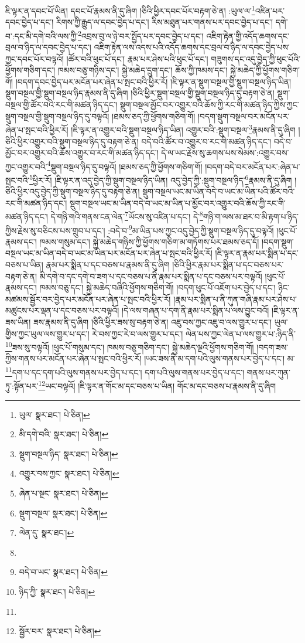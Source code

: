 ཇི་ལྟར་ན་དབང་པོ་ཡིན། དབང་པོ་རྣམས་ནི་དུ་ཞིག །ཅིའི་ཕྱིར་དབང་པོར་བརྟག་ཅེ་ན། :ཡུལ་ལ་\footnote{ཡུལ་  སྣར་ཐང་།  པེ་ཅིན། }འཛིན་པར་དབང་བྱེད་པ་དང་། རིགས་ཀྱི་རྒྱུད་ལ་དབང་བྱེད་པ་དང་། རིས་མཐུན་པར་གནས་པར་དབང་བྱེད་པ་དང་། དགེ་བ་:དང་མི་དགེ་བའི་ལས་ཀྱི་\footnote{མི་དགེ་བའི་  སྣར་ཐང་།  པེ་ཅིན། }འབྲས་བུ་ལ་ཉེ་བར་སྤྱོད་པར་དབང་བྱེད་པ་དང་། འཇིག་རྟེན་གྱི་འདོད་ཆགས་དང་བྲལ་བ་ཉིད་ལ་དབང་བྱེད་པ་དང་། འཇིག་རྟེན་ལས་འདས་པའི་འདོད་ཆགས་དང་བྲལ་བ་ཉིད་ལ་དབང་བྱེད་པས་ཀྱང་དབང་པོར་བལྟའོ། །ཚོར་བའི་ཕུང་པོ་དང་། རྣམ་པར་ཤེས་པའི་ཕུང་པོ་དང་། གཟུགས་དང་འདུ་བྱེད་ཀྱི་ཕུང་པོའི་ཕྱོགས་གཅིག་དང་། ཁམས་བཅུ་གཉིས་དང་། སྐྱེ་མཆེད་དྲུག་དང་། ཆོས་ཀྱི་ཁམས་དང་། སྐྱེ་མཆེད་ཀྱི་ཕྱོགས་གཅིག་གོ། །བདག་དབང་བྱེད་པར་མངོན་པར་ཞེན་པ་སྤང་བའི་ཕྱིར་རོ། །ཇི་ལྟར་ན་སྡུག་བསྔལ་གྱི་སྡུག་བསྔལ་ཉིད་ཡིན། སྡུག་བསྔལ་གྱི་སྡུག་བསྔལ་ཉིད་རྣམས་ནི་དུ་ཞིག །ཅིའི་ཕྱིར་སྡུག་བསྔལ་གྱི་སྡུག་བསྔལ་ཉིད་དུ་བརྟག་ཅེ་ན། སྡུག་བསྔལ་གྱི་ཚོར་བའི་རང་གི་མཚན་ཉིད་དང་། སྡུག་བསྔལ་མྱོང་བར་འགྱུར་བའི་ཆོས་ཀྱི་རང་གི་མཚན་ཉིད་ཀྱིས་ཀྱང་སྡུག་བསྔལ་གྱི་སྡུག་བསྔལ་ཉིད་དུ་བལྟའོ། །ཐམས་ཅད་ཀྱི་ཕྱོགས་གཅིག་གོ། །བདག་སྡུག་བསྔལ་བར་མངོན་པར་ཞེན་པ་སྤང་བའི་ཕྱིར་རོ། །ཇི་ལྟར་ན་འགྱུར་བའི་སྡུག་བསྔལ་ཉིད་ཡིན། འགྱུར་བའི་:སྡུག་བསྔལ་\footnote{སྡུག་བསྔལ་ཉིད་  སྣར་ཐང་།  པེ་ཅིན། }རྣམས་ནི་དུ་ཞིག །ཅིའི་ཕྱིར་འགྱུར་བའི་སྡུག་བསྔལ་ཉིད་དུ་བརྟག་ཅེ་ན། བདེ་བའི་ཚོར་བ་འགྱུར་བ་རང་གི་མཚན་ཉིད་དང་། བདེ་བ་མྱོང་བར་འགྱུར་བའི་ཆོས་འགྱུར་བ་རང་གི་མཚན་ཉིད་དང་། དེ་ལ་ཡང་རྗེས་སུ་ཆགས་པས་སེམས་:འགྱུར་བས་ཀྱང་འགྱུར་བའི་\footnote{འགྱུར་བས་ཀྱང་  སྣར་ཐང་།  པེ་ཅིན། }སྡུག་བསྔལ་ཉིད་དུ་བལྟའོ། །ཐམས་ཅད་ཀྱི་ཕྱོགས་གཅིག་གོ། །བདག་བདེ་བར་མངོན་པར་:ཞེན་པ་སྤང་བའི་\footnote{ཞེན་པ་སྔང་  སྣར་ཐང་།  པེ་ཅིན། }ཕྱིར་རོ། །ཇི་ལྟར་ན་འདུ་བྱེད་ཀྱི་སྡུག་བསྔལ་ཉིད་ཡིན། འདུ་བྱེད་ཀྱི་:སྡུག་བསྔལ་ཉིད་\footnote{སྡུག་བསྔལ་  སྣར་ཐང་།  པེ་ཅིན། }རྣམས་ནི་དུ་ཞིག །ཅིའི་ཕྱིར་འདུ་བྱེད་ཀྱི་སྡུག་བསྔལ་ཉིད་དུ་བརྟག་ཅེ་ན། སྡུག་བསྔལ་ཡང་མ་ཡིན་བདེ་བ་ཡང་མ་ཡིན་པའི་ཚོར་བའི་རང་གི་མཚན་ཉིད་དང་། སྡུག་བསྔལ་ཡང་མ་ཡིན་བདེ་བ་ཡང་མ་ཡིན་པ་མྱོང་བར་འགྱུར་བའི་ཆོས་ཀྱི་རང་གི་མཚན་ཉིད་དང་། དེ་གཉི་གའི་གནས་ངན་ལེན་\footnote{ལེན་དུ་  སྣར་ཐང་། }ཡོངས་སུ་འཛིན་པ་དང་། དེ་\footnote{}གཉི་ག་ལས་མ་ཐར་བ་མི་རྟག་པ་ཉིད་ཀྱིས་རྗེས་སུ་བཅིངས་པས་གྲུབ་པ་དང་། :བདེ་བ་\footnote{བདེ་བ་ཡང་  སྣར་ཐང་།  པེ་ཅིན། }མ་ཡིན་པས་ཀྱང་འདུ་བྱེད་ཀྱི་སྡུག་བསྔལ་ཉིད་དུ་བལྟའོ། །ཕུང་པོ་རྣམས་དང་། ཁམས་གསུམ་དང་། སྐྱེ་མཆེད་གཉིས་ཀྱི་ཕྱོགས་གཅིག་མ་གཏོགས་པར་ཐམས་ཅད་དོ། །བདག་སྡུག་བསྔལ་ཡང་མ་ཡིན་བདེ་བ་ཡང་མ་ཡིན་པར་མངོན་པར་ཞེན་པ་སྤང་བའི་ཕྱིར་རོ། །ཇི་ལྟར་ན་རྣམ་པར་སྨིན་པ་དང་བཅས་པ་ཡིན། རྣམ་པར་སྨིན་པ་དང་བཅས་པ་རྣམས་ནི་དུ་ཞིག །ཅིའི་ཕྱིར་རྣམ་པར་སྨིན་པ་དང་བཅས་པར་བརྟག་ཅེ་ན། མི་དགེ་བ་དང་དགེ་བ་ཟག་པ་དང་བཅས་པ་ནི་རྣམ་པར་སྨིན་པ་དང་བཅས་པར་བལྟའོ། །ཕུང་པོ་རྣམས་དང་། ཁམས་བཅུ་དང་། སྐྱེ་མཆེད་བཞིའི་ཕྱོགས་གཅིག་གོ། །བདག་ཕུང་པོ་འཇོག་པར་བྱེད་པ་དང་། ཉིང་མཚམས་སྦྱོར་བར་བྱེད་པར་མངོན་པར་ཞེན་པ་སྤང་བའི་ཕྱིར་རོ། །རྣམ་པར་སྨིན་པ་ནི་ཀུན་གཞི་རྣམ་པར་ཤེས་པ་མཚུངས་པར་ལྡན་པ་དང་བཅས་པར་བལྟའོ། །དེ་ལས་གཞན་པ་དག་ནི་རྣམ་པར་སྨིན་པ་ལས་བྱུང་བའོ། །ཇི་ལྟར་ན་ཟས་ཡིན། ཟས་རྣམས་ནི་དུ་ཞིག །ཅིའི་ཕྱིར་ཟས་སུ་བརྟག་ཅེ་ན། འཇུ་བས་ཀྱང་འཇུ་བ་ལས་གྱུར་པ་དང་། ཡུལ་གྱིས་ཀྱང་ཡུལ་ལས་གྱུར་པ་དང་། རེ་བས་ཀྱང་རེ་བ་ལས་གྱུར་པ་དང་། ལེན་པས་ཀྱང་ལེན་པ་ལས་གྱུར་པ་:ཉིད་ནི་\footnote{ཉིད་ཀྱི་  སྣར་ཐང་།  པེ་ཅིན། }ཟས་སུ་བལྟའོ། །ཕུང་པོ་གསུམ་དང་། ཁམས་བཅུ་གཅིག་དང་། སྐྱེ་མཆེད་ལྔའི་ཕྱོགས་གཅིག་གོ། །བདག་ཟས་ཀྱིས་གནས་པར་མངོན་པར་ཞེན་པ་སྤང་བའི་ཕྱིར་རོ། །ཡང་ཟས་ནི་མ་དག་པའི་ལུས་གནས་པར་བྱེད་པ་དང་། མ་\footnote{}དག་པ་དང་དག་པའི་ལུས་གནས་པར་བྱེད་པ་དང་། དག་པའི་ལུས་གནས་པར་བྱེད་པ་དང་། གནས་པར་ཀུན་ཏུ་:སྟོན་པར་\footnote{སྦྱོར་བར་  སྣར་ཐང་།  པེ་ཅིན། }ཡང་བལྟའོ། །ཇི་ལྟར་ན་གོང་མ་དང་བཅས་པ་ཡིན། གོང་མ་དང་བཅས་པ་རྣམས་ནི་དུ་ཞིག 